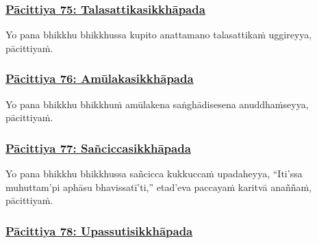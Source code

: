 \subsubsection*{\hyperref[exp75]{Pācittiya 75: Talasattikasikkhāpada}}
\label{pac75}

Yo pana bhikkhu bhikkhussa kupito\makeatletter\hyperlink{endnote401-appendix}\makeatother{} anattamano talasattikaṁ uggireyya, pācittiyaṁ.



\subsubsection*{\hyperref[exp76]{Pācittiya 76: Amūlakasikkhāpada}}
\label{pac76}

Yo pana bhikkhu bhikkhuṁ amūlakena saṅghādisesena anuddhaṁseyya, pācittiyaṁ.



\subsubsection*{\hyperref[exp77]{Pācittiya 77: Sañciccasikkhāpada}}
\label{pac77}

Yo pana bhikkhu bhikkhussa sañcicca\makeatletter\hyperlink{endnote402-appendix}\makeatother{} kukkuccaṁ upadaheyya,\makeatletter\hyperlink{endnote403-appendix}\makeatother{} ``Iti'ssa muhuttam'pi aphāsu bhavissatī'ti,'' etad'eva paccayaṁ karitvā anaññaṁ, pācittiyaṁ.



\subsubsection*{\hyperref[exp78]{Pācittiya 78: Upassutisikkhāpada}}
\label{pac78}

